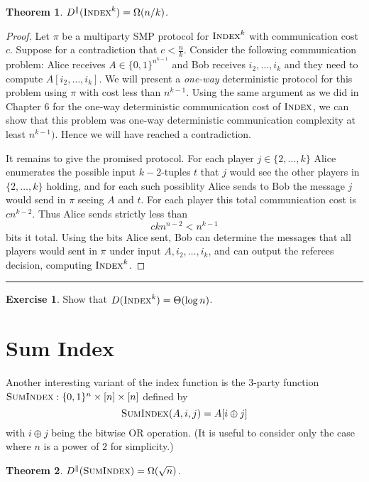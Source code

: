 \documentclass[11pt]{amsart}
\theoremstyle{plain}
\newtheorem{theorem}{Theorem}
\theoremstyle{definition}
\newtheorem{exercise}{Exercise}
\theoremstyle{plain}
\newcommand{\Index}{\textsc{Index}}
\newcommand{\SumIndex}{\textsc{SumIndex}}
\newcommand{\exercises}{\bigskip \noindent\rule{8cm}{0.4pt} \medskip}
\begin{document}
\begin{theorem}
$D^\parallel(\Index^k) = \Omega(n/k)$.
\end{theorem}

\begin{proof}
Let $\pi$ be a multiparty SMP protocol for $\Index^k$ with communication cost $c$. Suppose for a contradiction that $c < \frac{n}{k}$. Consider the following communication problem: Alice receives $A \in \{0,1\}^{n^{k-1}}$ and Bob receives $i_2,\dots, i_k$ and they need to compute $A[i_2,\dots, i_k]$. We will present a \emph{one-way} deterministic protocol for this problem using $\pi$ with cost less than $n^{k-1}$. Using the same argument as we did in Chapter $6$ for the one-way deterministic communication cost of $\Index$, we can show that this problem was one-way deterministic communication complexity at least $n^{{k-1}})$. Hence we will have reached a contradiction.

It remains to give the promised protocol. For each player $j \in \{2, \dots, k\}$ Alice enumerates the possible input $k-2$-tuples $t$ that $j$ would see the other players in $\{2,\dots, k\}$ holding, and for each such possiblity Alice sends to Bob the message $j$ would send in $\pi$ seeing $A$ and $t$. For each player this total communication cost is $cn^{k-2}$. Thus Alice sends strictly less than
$$ckn^{n-2} < n^{k-1}$$
bits it total.
Using the bits Alice sent, Bob can determine the messages that all players would sent in $\pi$ under input $A,i_2,\dots, i_k$, and can output the referees decision, computing $\Index^k$.
\end{proof}

\exercises

\begin{exercise}
Show that $D(\Index^k) = \Theta(\log n)$.
\end{exercise}


\newpage 
\section{Sum Index}

Another interesting variant of the index function is the 3-party function $\SumIndex : \{0,1\}^n \times [n] \times [n]$ defined by
\[
\SumIndex(A,i,j) = A[ i \oplus j]
\]
with $i \oplus j$ being the bitwise OR operation. (It is useful to consider only the case where $n$ is a power of $2$ for simplicity.)

\begin{theorem}
$D^\parallel(\SumIndex) = \Omega(\sqrt{n})$.
\end{theorem}
\end{document}
